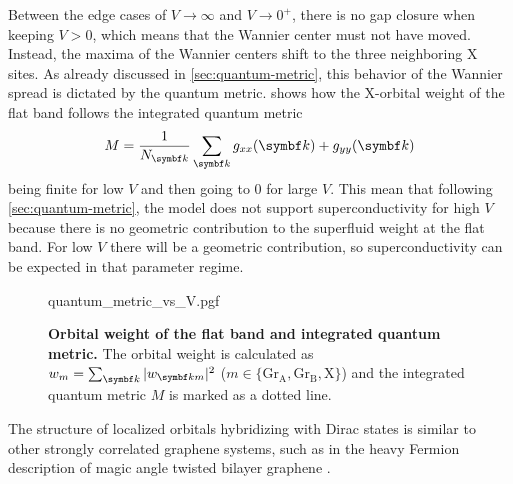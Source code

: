 \documentclass[../main.tex]{subfiles}
\begin{document}
Between the edge cases of \(V \to \infty\) and \(V \to 0^+\), there is no gap closure when keeping \(V > 0\), which means that the Wannier center must not have moved.
Instead, the maxima of the Wannier centers shift to the three neighboring \(\mathrm{X}\) sites.
As already discussed in \cref{sec:quantum-metric}, this behavior of the Wannier spread is dictated by the quantum metric.
 shows how the \(\mathrm{X}\)-orbital weight of the flat band follows the integrated quantum metric
\begin{equation}
	M = \frac{1}{N_{\vb{k}}} \sum_{\vb{k}} g_{xx} (\vb{k}) + g_{yy} (\vb{k})
\end{equation}
being finite for low \(V\) and then going to 0 for large \(V\).
This mean that following \cref{sec:quantum-metric}, the model does not support superconductivity for high \(V\) because there is no geometric contribution to the superfluid weight at the flat band.
For low \(V\) there will be a geometric contribution, so superconductivity can be expected in that parameter regime.
\begin{SCfigure}[1][t]
	\centering
	{quantum_metric_vs_V.pgf}
	\caption[Orbital weight of the flat band and integrated quantum metric.]{\textbf{Orbital weight of the flat band and integrated quantum metric.} The orbital weight is calculated as \(w_m = \sum_{\vb{k}} \vert w_{\vb{k} m} \vert^2\) (\(m \in \{\mathrm{Gr}_{\mathrm{A}}, \mathrm{Gr}_{\mathrm{B}}, \mathrm{X}\}\)) and the integrated quantum metric \(M\) is marked as a dotted line.}
	\label{fig:decorated graphene model quantum metric}
\end{SCfigure}
The structure of localized orbitals hybridizing with Dirac states is similar to other strongly correlated graphene systems, such as in the heavy Fermion description of magic angle twisted bilayer graphene \cite{songMagicAngleTwistedBilayer2022}.
	
\end{document}
